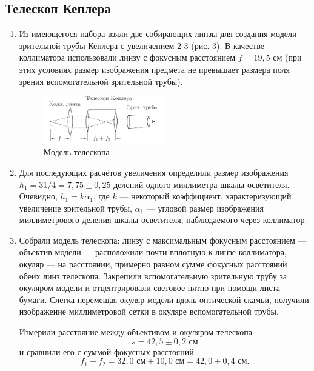 \documentclass[a4paper,12pt]{article}
\begin{document}
	\subsection*{Телескоп Кеплера}
	\begin{enumerate}
		\item Из имеющегося набора взяли две собирающих линзы для создания модели
		зрительной трубы Кеплера с увеличением 2-3 (рис. 3). В качестве коллиматора использовали линзу с фокусным расстоянием $f = 19{,}5$ см (при этих
		условиях размер изображения предмета не превышает размера поля
		зрения вспомогательной зрительной трубы).
											
		\begin{figure}
			\begin{center}
				\includegraphics[width = 0.5\textwidth]{412-3.png}
				\caption{Модель телескопа}
			\end{center}
		\end{figure}
		
		\item Для последующих расчётов увеличения определили размер изображения $h_1 = 31/4 =7{,}75\pm0{,}25$ делений одного миллиметра шкалы осветителя. Очевидно, $h_1 = k\alpha_1$, где $k$ --- некоторый коэффициент, характеризующий увеличение зрительной трубы, $\alpha_1$ --- угловой размер изображения миллиметрового деления шкалы осветителя, наблюдаемого через коллиматор.
		
		\item Собрали модель телескопа: линзу с максимальным фокусным расстоянием --- объектив модели --- расположили почти вплотную к линзе коллиматора, окуляр --- на расстоянии, примерно равном сумме фокусных расстояний обеих линз телескопа.
		Закрепили вспомогательную зрительную трубу за окуляром модели и отцентрировали световое пятно при помощи листа бумаги. Слегка перемещая окуляр модели вдоль оптической скамьи, получили изображение миллиметровой сетки в окуляре вспомогательной трубы.
		
		Измерили расстояние между объективом и окуляром телескопа 
		\begin{equation*}
		s = 42{,}5\pm0{,}2\text{ см}
		\end{equation*}
		и сравнили его с суммой фокусных расстояний:
		\begin{equation*}
			f_1+f_2 = 32{,}0\text{ см} + 10{,}0\text{ см} = 42{,}0\pm0{,}4\text{ см}.
		\end{equation*}
		

\end{enumerate}
\end{document}
